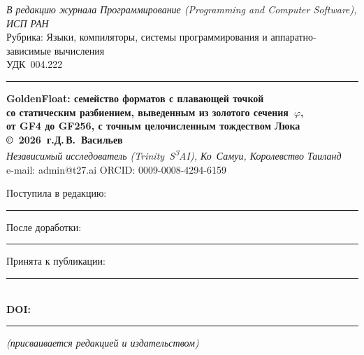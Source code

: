 \documentclass[12pt,a4paper]{article}
\begin{document}
\thispagestyle{empty}

\begin{flushleft}\small
\textit{В редакцию журнала \guillemotleft Программирование\guillemotright{} (Programming and Computer Software), ИСП РАН}\\[2pt]
Рубрика: Языки, компиляторы, системы программирования и аппаратно-зависимые вычисления\\[2pt]
УДК~004.222
\end{flushleft}

\vspace{0.4cm}
\hrule
\vspace{0.6cm}

\begin{center}
{\large\textbf{GoldenFloat: семейство форматов с плавающей точкой\\
со статическим разбиением, выведенным из золотого сечения~\(\varphi\),\\
от GF4 до GF256, с точным целочисленным тождеством Люка}}\\[10pt]
\textbf{\copyright~2026~г.\quad Д.\,В.~Васильев}\\[6pt]
\textit{Независимый исследователь (Trinity~S\textsuperscript{3}AI), Ко~Самуи, Королевство Таиланд}\\[4pt]
e-mail: admin@t27.ai \quad\textbar\quad ORCID: 0009-0008-4294-6159
\end{center}

\vspace{0.3cm}
\begin{flushleft}\small
Поступила в редакцию: \rule{2.8cm}{0.4pt}\quad
После доработки: \rule{2.8cm}{0.4pt}\quad
Принята к публикации: \rule{2.8cm}{0.4pt}\\[4pt]
\textbf{DOI:}~\rule{4.5cm}{0.4pt}\quad\textit{(присваивается редакцией и издательством)}
\end{flushleft}
\end{document}
